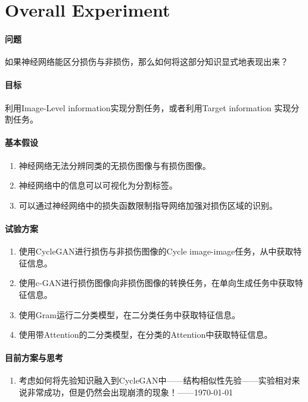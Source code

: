 \section{Overall Experiment}

\paragraph{问题}
如果神经网络能区分损伤与非损伤，那么如何将这部分知识显式地表现出来？

\paragraph{目标}
利用Image-Level information实现分割任务，或者利用Target information 实现分割任务。

\paragraph{基本假设}

\begin{enumerate}[1.]
	\item 神经网络无法分辨同类的无损伤图像与有损伤图像。
	\item 神经网络中的信息可以可视化为分割标签。
	\item 可以通过神经网络中的损失函数限制指导网络加强对损伤区域的识别。
\end{enumerate}

\paragraph{试验方案}

\begin{enumerate}[1.]
	\item {}使用CycleGAN进行损伤与非损伤图像的Cycle image-image任务，从中获取特征信息。
	\item 使用c-GAN进行损伤图像向非损伤图像的转换任务，在单向生成任务中获取特征信息。
	\item 使用Gram运行二分类模型，在二分类任务中获取特征信息。
	\item 使用带Attention的二分类模型，在分类的Attention中获取特征信息。

\end{enumerate}

\paragraph{目前方案与思考}
\begin{enumerate}[1]
	\item 考虑如何将先验知识融入到CycleGAN中——结构相似性先验——实验相对来说非常成功，但是仍然会出现崩溃的现象！——\mbox{\today}


\end{enumerate}

\newpage